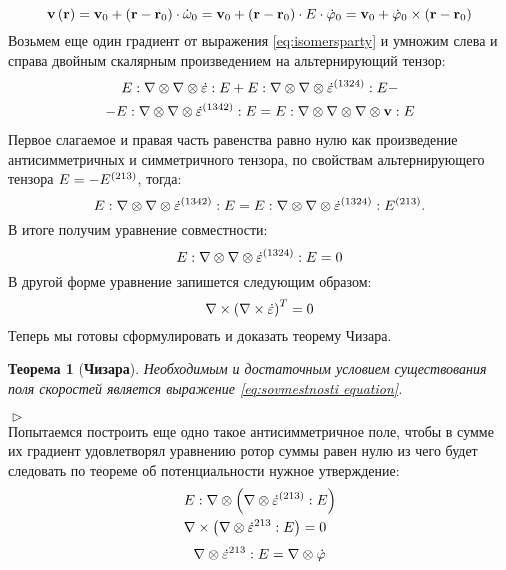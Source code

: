 \documentclass[a4papper, 14pt]{book}
\renewcommand{\epsilon}{\ensuremath{\varepsilon}}
\renewcommand{\phi}{\ensuremath{\varphi}}
\newcommand{\diad}{\ensuremath\otimes}
\newcommand{\lf}{\ensuremath \left(}
\newcommand{\ri}{\ensuremath \right)}
\newcommand{\mf}[1]{\ensuremath\mathbf{#1}}
\theoremstyle{plain} %
\newtheorem{theorem}{Теорема}[subsection]
\theoremstyle{definition} %
\theoremstyle{remark} %
\begin{document}
	\begin{equation}
	\mf{v}\lf\mf{r}\ri = \mf{v}_0 + \lf \mf{r} - \mf{r}_0 \ri\cdot\dot{\omega}_0 =\mf{v}_0 + \lf \mf{r} - \mf{r}_0 \ri\cdot E\cdot\dot{\mf{\phi}}_0= \mf{v}_0 + \dot{\mf{\phi}}_0 \times\lf \mf{r} - \mf{r}_0 \ri 
	\end{equation}
	Возьмем еще один градиент от выражения \eqref{eq:isomersparty} и умножим слева и справа двойным скалярным произведением на альтернирующий тензор:
	\begin{multline}
	E:\nabla\diad\nabla\diad\dot{\epsilon}:E + E:\nabla\diad\nabla\diad\dot{\epsilon}^{\lf 1324\ri}:E -\\- E:\nabla\diad\nabla\diad\dot{\epsilon}^{\lf 1342\ri}:E =E:\nabla\diad\nabla\diad\nabla\diad\mf{v}:E
	\end{multline}
	Первое слагаемое и правая часть равенства равно нулю как произведение антисимметричных и симметричного тензора, по свойствам альтернирующего тензора $E =- E^{\lf 213\ri}$, тогда:  
	$$E:\nabla\diad\nabla\diad\dot{\epsilon}^{\lf 1342\ri}:E = E:\nabla\diad\nabla\diad\dot{\epsilon}^{\lf 1324\ri}:E^{\lf 213\ri}.$$
	В итоге получим уравнение совместности:
	\begin{equation}\label{eq:sovmestnosti equation}
	E:\nabla\diad\nabla\diad\dot{\epsilon}^{\lf 1324\ri}:E = 0
	\end{equation}
	В другой форме уравнение запишется следующим образом:
	\begin{equation}
	\nabla\times\lf\nabla\times\dot{\epsilon}\ri^T = 0
	\end{equation}
	Теперь мы готовы сформулировать и доказать теорему Чизара.
	\begin{theorem}[{\textbf{Чизара}}]
		Необходимым и достаточным условием существования поля скоростей является выражение \eqref{eq:sovmestnosti equation}.
	\end{theorem}
	$\vartriangleright$\\
	Попытаемся построить еще одно такое антисимметричное поле, чтобы в сумме их градиент удовлетворял уравнению ротор суммы равен нулю из чего будет следовать по теореме об потенциальности нужное утверждение:
	\begin{align}
	&E:\nabla\diad\lf\nabla\diad\dot{\epsilon}^{\lf 213\ri}:E\ri\\
	&\nabla\times\lf\nabla\diad\dot{\epsilon}^{213}:E\ri = 0
	\end{align}
	\begin{equation}
	\nabla\diad\dot{\epsilon}^{213}:E = \nabla\diad\dot{\mf{\phi }}
	\end{equation}
\end{document}

